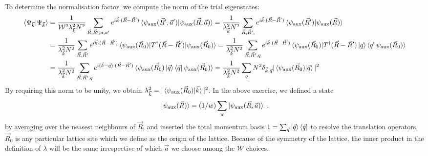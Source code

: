 \documentclass{report}
\numberwithin{equation}{section}
\begin{document}
To determine the normalisation factor, we compute the norm of the trial eigenstates:
\begin{equation}\begin{aligned}
	\braket{\Psi_{\vec k} | \Psi_{\vec k}} &= \frac{1}{\mathcal{W}^2 \lambda_{\vec k}^2 N^2}\sum_{\vec R, \vec R^\prime, a, a^\prime}e^{i \vec{k}\cdot(\vec R - \vec R^\prime)}\braket{\psi_\text{aux}(\vec R^\prime, \vec a^\prime) | \psi_\text{aux}(\vec R, \vec a)} = \frac{1}{\lambda_{\vec k}^2 N^2}\sum_{\vec R, \vec R^\prime, }e^{i \vec{k}\cdot(\vec R - \vec R^\prime)}\braket{\psi_\text{aux}(\vec R^\prime) | \psi_\text{aux}(\vec R)}\\
					       &=\frac{1}{\lambda_{\vec k}^2 N^2}\sum_{\vec R, \vec R^\prime}e^{i \vec{k}\cdot(\vec R - \vec R^\prime)}\braket{\psi_\text{aux}(\vec R_0) | T^\dagger(\vec R - \vec R^\prime) | \psi_\text{aux}(\vec R_0)} = \frac{1}{\lambda_{\vec k}^2 N^2}\sum_{\vec R, \vec R^\prime, q}e^{i \vec{k}\cdot(\vec R - \vec R^\prime)}\braket{\psi_\text{aux}(\vec R_0) | T^\dagger(\vec R - \vec R^\prime) \ket{\vec q}\bra{\vec q} \psi_\text{aux}(\vec R_0)}\\
					       &= \frac{1}{\lambda_{\vec k}^2 N^2}\sum_{\vec R, \vec R^\prime, q}e^{i (\vec{k} - \vec q)\cdot(\vec R - \vec R^\prime)}\braket{\psi_\text{aux}(\vec R_0) \ket{\vec q}\bra{\vec q} \psi_\text{aux}(\vec R_0)} = \frac{1}{\lambda_{\vec k}^2 N^2}\sum_{q} N^2 \delta_{\vec{k},\vec q}|\braket{\psi_\text{aux}(\vec R_0) | \vec q}|^2\\
\end{aligned}\end{equation}
By requiring this norm to be unity, we obtain \(\lambda_{\vec k}^2 = |\braket{\psi_\text{aux}(\vec R_0) | \vec k}|^2\). In the above exercise, we defined a state 
\begin{equation}\begin{aligned}\label{zeroth_site_average}
	\ket{\psi_\text{aux}(\vec R)} = (1/w)\sum_{\vec a}\ket{\psi_\text{aux}(\vec R, \vec a)}~,
\end{aligned}\end{equation}
by averaging over the neasest neighbours of \(\vec R\), and inserted the total momentum basis \(1 = \sum_{\vec q}\ket{\vec q}\bra{\vec q}\) to resolve the translation operators. \(\vec R_0\) is any particular lattice site which we define as the origin of the lattice. Because of the symmetry of the lattice, the inner product in the definition of \(\lambda\) will be the same irrespective of which \(\vec a\) we choose among the \(\mathcal{W}\) choices.
\end{document}
